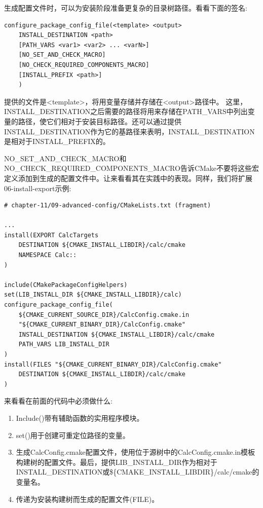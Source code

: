生成配置文件时，可以为安装阶段准备更复杂的目录树路径。看看下面的签名:

\begin{lstlisting}[style=styleCMake]
configure_package_config_file(<template> <output>
	INSTALL_DESTINATION <path>
	[PATH_VARS <var1> <var2> ... <varN>]
	[NO_SET_AND_CHECK_MACRO]
	[NO_CHECK_REQUIRED_COMPONENTS_MACRO]
	[INSTALL_PREFIX <path>]
	)
\end{lstlisting}

提供的文件是<template>，将用变量存储并存储在<output>路径中。 这里，INSTALL\_DESTINATION之后需要的路径将用来存储在PATH\_VARS中列出变量的路径，使它们相对于安装目标路径。还可以通过提供INSTALL\_DESTINATION作为它的基路径来表明，INSTALL\_DESTINATION是相对于INSTALL\_PREFIX的。

NO\_SET\_AND\_CHECK\_MACRO和NO\_CHECK\_REQUIRED\_COMPONENTS\_MACRO告诉CMake不要将这些宏定义添加到生成的配置文件中。让来看看其在实践中的表现。同样，我们将扩展06-install-export示例:

\begin{lstlisting}[style=styleCMake]
# chapter-11/09-advanced-config/CMakeLists.txt (fragment)

...
install(EXPORT CalcTargets
	DESTINATION ${CMAKE_INSTALL_LIBDIR}/calc/cmake
	NAMESPACE Calc::
)

include(CMakePackageConfigHelpers)
set(LIB_INSTALL_DIR ${CMAKE_INSTALL_LIBDIR}/calc)
configure_package_config_file(
	${CMAKE_CURRENT_SOURCE_DIR}/CalcConfig.cmake.in
	"${CMAKE_CURRENT_BINARY_DIR}/CalcConfig.cmake"
	INSTALL_DESTINATION ${CMAKE_INSTALL_LIBDIR}/calc/cmake
	PATH_VARS LIB_INSTALL_DIR
)
install(FILES "${CMAKE_CURRENT_BINARY_DIR}/CalcConfig.cmake"
	DESTINATION ${CMAKE_INSTALL_LIBDIR}/calc/cmake
)
\end{lstlisting}

来看看在前面的代码中必须做什么:

\begin{enumerate}
\item 
Include()带有辅助函数的实用程序模块。

\item 
set()用于创建可重定位路径的变量。

\item 
生成CalcConfig.cmake配置文件，使用位于源树中的CalcConfig.cmake.in模板构建树的配置文件。最后，提供LIB\_INSTALL\_DIR作为相对于INSTALL\_DESTINATION或\$\{CMAKE\_INSTALL\_LIBDIR\}/calc/cmake的变量名。

\item 
传递为安装构建树而生成的配置文件(FILE)。
\end{enumerate}

